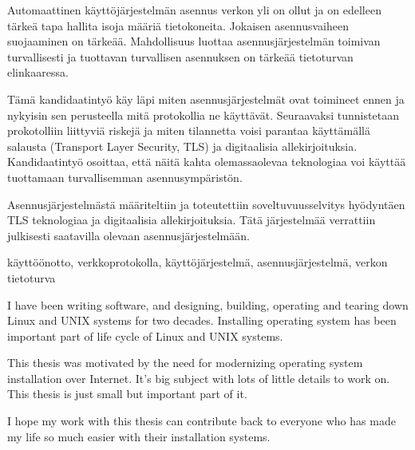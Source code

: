\documentclass[a4paper,12pt,titlepage]{dithesis}
\begin{document}
\begin{tiivistelma}

Automaattinen käyttöjärjestelmän asennus verkon yli on ollut ja on
edelleen tärkeä tapa hallita isoja määriä tietokoneita. Jokaisen
asennusvaiheen suojaaminen on tärkeää. Mahdollisuus luottaa
asennusjärjestelmän toimivan turvallisesti ja tuottavan turvallisen
asennuksen on tärkeää tietoturvan elinkaaressa.

Tämä kandidaatintyö käy läpi miten asennusjärjestelmät ovat toimineet
ennen ja nykyisin sen perusteella mitä protokollia ne
käyttävät. Seuraavaksi tunnistetaan prokotolliin liittyviä riskejä ja
miten tilannetta voisi parantaa käyttämällä salausta (Transport Layer
Security, TLS) ja digitaalisia allekirjoituksia. Kandidaatintyö
osoittaa, että näitä kahta olemassaolevaa teknologiaa voi käyttää
tuottamaan turvallisemman asennusympäristön.

Asennusjärjestelmästä määriteltiin ja toteutettiin soveltuvuusselvitys
hyödyntäen TLS teknologiaa ja digitaalisia allekirjoituksia. Tätä
järjestelmää verrattiin julkisesti saatavilla olevaan
asennusjärjestelmään.

\avainsanat käyttöönotto, verkkoprotokolla, käyttöjärjestelmä, asennusjärjestelmä, verkon tietoturva
\end{tiivistelma}


\sisluettelo

I have been writing software, and designing, building, operating and
tearing down Linux and UNIX systems for two decades. Installing
operating system has been important part of life cycle of Linux and
UNIX systems.

This thesis was motivated by the need for modernizing operating system
installation over Internet. It's big subject with lots of little
details to work on. This thesis is just small but important part of
it.

I hope my work with this thesis can contribute back to everyone who
has made my life so much easier with their installation systems.
\end{document}
